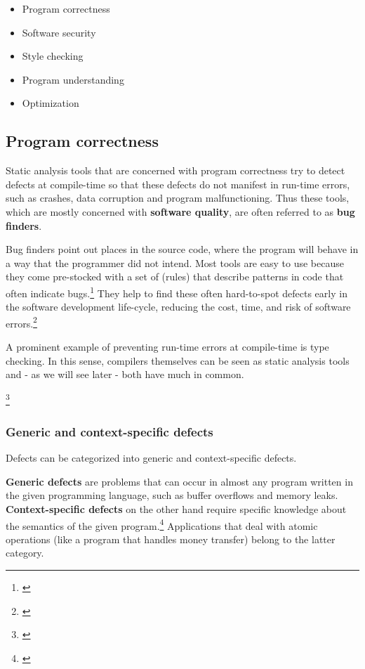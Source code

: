 \begin{itemize}\addtolength{\itemsep}{-0.5\baselineskip}
\item Program correctness
\item Software security
\item Style checking
\item Program understanding
\item Optimization
\end{itemize}

\subsection{Program correctness}

Static analysis tools that are concerned with program correctness try to detect defects at compile-time so that these defects do not manifest in run-time errors, such as crashes, data corruption and program malfunctioning. Thus these tools, which are mostly concerned with \textbf{software quality}, are often referred to as \textbf{bug finders}.

Bug finders point out places in the source code, where the program will behave in a way that the programmer did not intend. Most tools are easy to use because they come pre-stocked with a set of  (rules) that describe patterns in code that often indicate bugs.\footnote{\citep[32]{SecureProgramming}} They help to find these often hard-to-spot defects early in the software development life-cycle, reducing the cost, time, and risk of software errors.\footnote{\citep{CovertySA}}

A prominent example of preventing run-time errors at compile-time is type checking. In this sense, compilers themselves can be seen as static analysis tools and - as we will see later - both have much in common.

\footnote{\citep[1]{UsingSAToFindBugs}}

\subsubsection{Generic and context-specific defects}

Defects can be categorized into generic and context-specific defects.

\textbf{Generic defects} are problems that can occur in almost any program written in the given programming language, such as buffer overflows and memory leaks.\\
\textbf{Context-specific defects} on the other hand require specific knowledge about the semantics of the given program.\footnote{\citep[14]{SecureProgramming}} Applications that deal with atomic operations (like a program that handles money transfer) belong to the latter category.

